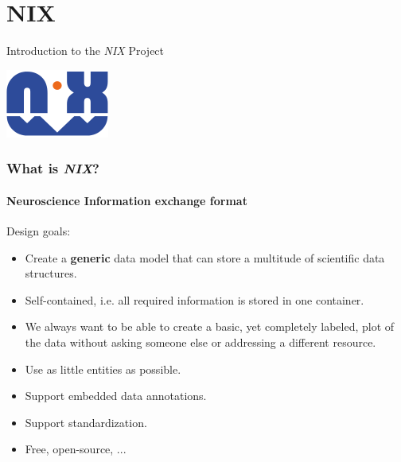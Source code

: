 \documentclass[pdftex, xcolor=table]{beamer}
\newcommand{\rot}[1]{{\color{tug} #1}}
\newcommand{\nix}{\textit{NIX}}
\begin{document}
\section{NIX}
\begin{frame}
  \huge{\rot{Introduction to the \textit{NIX} Project}}
  \vspace{4ex}
  \begin{center}
    \includegraphics[width=0.25\linewidth]{images/nix_logo.png}
  \end{center}
\end{frame}

\begin{frame}
  \frametitle{What is \nix{}?}
  \framesubtitle{Neuroscience Information exchange format}
  \noindent Design goals:
  \begin{itemize}
  \item Create a \textbf{generic} data model that can store a
    multitude of scientific data structures.
  \item Self-contained, i.e. all required information is stored in one container.
  \item We always want to be able to create a basic, yet completely labeled,
    plot of the data without asking someone else or addressing a
    different resource.
  \item Use as little entities as possible.
  \item Support embedded data annotations.
  \item Support standardization.
  \item Free, open-source, ...
  \end{itemize}
\end{frame}
\end{document}

